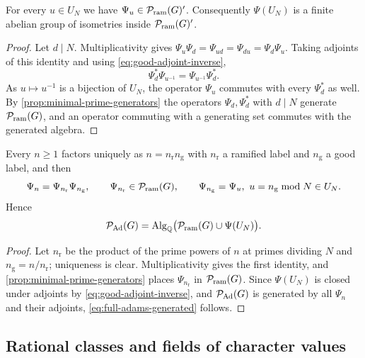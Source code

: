 \begin{proposition}
\label{prop:good-in-commutant}
For every \(u\in U_N\) we have \(\Psi_u\in\mathcal P_{\mathrm{ram}}(G)'\).  Consequently
\(\Psi(U_N)\) is a finite abelian group of isometries inside
\(\mathcal P_{\mathrm{ram}}(G)'\).
\end{proposition}

\begin{proof}
Let \(d\mid N\).  Multiplicativity gives
\(\Psi_u\Psi_d=\Psi_{ud}=\Psi_{du}=\Psi_d\Psi_u\).  Taking adjoints of this
identity and using \eqref{eq:good-adjoint-inverse},
\[
 \Psi_d^*\Psi_{u^{-1}}=\Psi_{u^{-1}}\Psi_d^*.
\]
As \(u\mapsto u^{-1}\) is a bijection of \(U_N\), the operator \(\Psi_u\)
commutes with every \(\Psi_d^*\) as well.  By
\cref{prop:minimal-prime-generators} the operators \(\Psi_d,\Psi_d^*\) with
\(d\mid N\) generate \(\mathcal P_{\mathrm{ram}}(G)\), and an operator commuting with a
generating set commutes with the generated algebra.
\end{proof}

\begin{proposition}
\label{prop:label-splitting}
Every \(n\geq1\) factors uniquely as \(n=n_{\mathrm{r}}n_{\mathrm{g}}\) with
\(n_{\mathrm{r}}\) a ramified label and \(n_{\mathrm{g}}\) a good label, and
then
\begin{equation}
 \Psi_n=\Psi_{n_{\mathrm{r}}}\Psi_{n_{\mathrm{g}}},
 \qquad
 \Psi_{n_{\mathrm{r}}}\in\mathcal P_{\mathrm{ram}}(G),
 \qquad
 \Psi_{n_{\mathrm{g}}}=\Psi_{u},\ u=n_{\mathrm{g}}\bmod N\in U_N.
 \label{eq:label-splitting}
\end{equation}
Hence
\begin{equation}
 \mathcal P_{\mathrm{Ad}}(G)=\operatorname{Alg}_\mathbb Q\bigl(\mathcal P_{\mathrm{ram}}(G)\cup\Psi(U_N)\bigr).
 \label{eq:full-adams-generated}
\end{equation}
\end{proposition}

\begin{proof}
Let \(n_{\mathrm{r}}\) be the product of the prime powers of \(n\) at primes
dividing \(N\) and \(n_{\mathrm{g}}=n/n_{\mathrm{r}}\); uniqueness is clear.
Multiplicativity gives the first identity, and
\cref{prop:minimal-prime-generators} places \(\Psi_{n_{\mathrm{r}}}\) in
\(\mathcal P_{\mathrm{ram}}(G)\).  Since \(\Psi(U_N)\) is closed under adjoints by
\eqref{eq:good-adjoint-inverse}, and \(\mathcal P_{\mathrm{Ad}}(G)\) is generated by all
\(\Psi_n\) and their adjoints, \eqref{eq:full-adams-generated} follows.
\end{proof}

\subsection{Rational classes and fields of character values}

